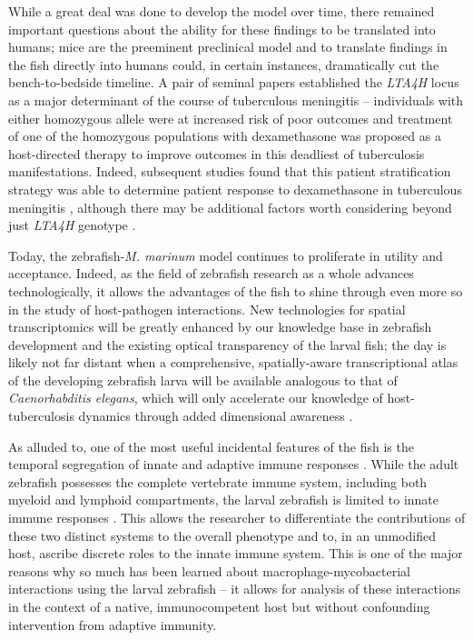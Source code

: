 While a great deal was done to develop the model over time, there remained important questions about the ability for these findings to be translated into humans; mice are the preeminent preclinical model and to translate findings in the fish directly into humans could, in certain instances, dramatically cut the bench\hyp{}to\hyp{}bedside timeline. A pair of seminal papers \citep{Tobin2010, Tobin2012} established the \textit{LTA4H} locus as a major determinant of the course of tuberculous meningitis -- individuals with either homozygous allele were at increased risk of poor outcomes and treatment of one of the homozygous populations with dexamethasone was proposed as a host\hyp{}directed therapy to improve outcomes in this deadliest of tuberculosis manifestations. Indeed, subsequent studies found that this patient stratification strategy was able to determine patient response to dexamethasone in tuberculous meningitis \citep{Thwaites2013, Prasad2016, Thuong2017, Wilkinson2017, Davis2018}, although there may be additional factors worth considering beyond just \textit{LTA4H} genotype \citep{Siddiqi2021}.

Today, the zebrafish\hyp{}\textit{M. marinum} model continues to proliferate in utility and acceptance. Indeed, as the field of zebrafish research as a whole advances technologically, it allows the advantages of the fish to shine through even more so in the study of host\hyp{}pathogen interactions. New technologies for spatial transcriptomics will be greatly enhanced by our knowledge base in zebrafish development and the existing optical transparency of the larval fish; the day is likely not far distant when a comprehensive, spatially\hyp{}aware transcriptional atlas of the developing zebrafish larva will be available analogous to that of \textit{Caenorhabditis elegans}, which will only accelerate our knowledge of host\hyp{}tuberculosis dynamics through added dimensional awareness \citep{Packer2019}.

As alluded to, one of the most useful incidental features of the fish is the temporal segregation of innate and adaptive immune responses \citep{Myllymaki2016}. While the adult zebrafish possesses the complete vertebrate immune system, including both myeloid and lymphoid compartments, the larval zebrafish is limited to innate immune responses \citep{Cronan2014}. This allows the researcher to differentiate the contributions of these two distinct systems to the overall phenotype and to, in an unmodified host, ascribe discrete roles to the innate immune system. This is one of the major reasons why so much has been learned about macrophage\hyp{}mycobacterial interactions using the larval zebrafish -- it allows for analysis of these interactions in the context of a native, immunocompetent host but without confounding intervention from adaptive immunity.

